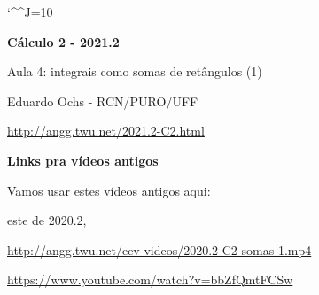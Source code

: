 \documentclass[oneside,12pt]{article}
\begin{document}
\catcode`\^^J=10

\pu


\def\drafturl{http://angg.twu.net/LATEX/2021-2-C2.pdf}
\def\drafturl{http://angg.twu.net/2021.2-C2.html}
\def\draftfooter{\tiny \href{\drafturl}{\jobname{}} \ColorBrown{\shorttoday{} \hours}}



%

\thispagestyle{empty}

\begin{center}

\vspace*{1.2cm}

{\bf \Large Cálculo 2 - 2021.2}

\bsk

Aula 4: integrais como somas de retângulos (1)

\bsk

Eduardo Ochs - RCN/PURO/UFF

\url{http://angg.twu.net/2021.2-C2.html}

\end{center}

\newpage


{\bf Links pra vídeos antigos}

\ssk

Vamos usar estes vídeos antigos aqui:

%
este de 2020.2,

\ssk

{\footnotesize

\url{http://angg.twu.net/eev-videos/2020.2-C2-somas-1.mp4}

\url{https://www.youtube.com/watch?v=bbZfQmtFCSw}

}
\end{document}
